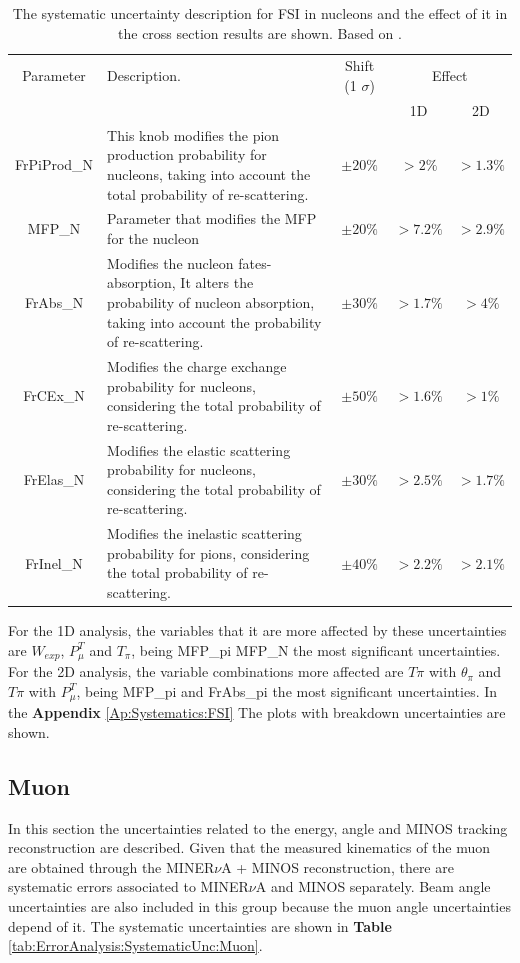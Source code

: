 \begin{table}[!htb]
    \centering
    \begin{tabular}{c|p{2in}|c|c|c}
        \hline 
        Parameter & Description.  & Shift (1 $\sigma$) & \multicolumn{2}{c}{Effect} \\
         & & & 1D & 2D \\
        \hline  
        FrPiProd\_N & This knob modifies the pion production probability for nucleons, taking into account the total probability of re-scattering. & $\pm20\%$ & $>2\%$ & $>1.3\%$\\ \hline
        MFP\_N & Parameter that modifies the MFP for the nucleon & $\pm20\%$ & $>7.2\%$ & $>2.9\%$ \\ \hline
        FrAbs\_N & Modifies the nucleon fates-absorption, It alters the probability of nucleon absorption, taking into account the probability of re-scattering. & $\pm30\%$ & $>1.7\%$ & $>4\%$ \\ \hline
        FrCEx\_N & Modifies the charge exchange probability for nucleons, considering the total probability of re-scattering. & $\pm50\%$ & $>1.6\%$ & $>1\%$\\ \hline
        FrElas\_N & Modifies the elastic scattering probability for nucleons, considering the total probability of re-scattering. & $\pm30\%$ & $>2.5\%$ & $>1.7\%$ \\ \hline
        FrInel\_N & Modifies the inelastic scattering probability for pions, considering the total probability of re-scattering. & $\pm40\%$ & $>2.2\%$ & $>2.1\%$\\ \hline
        
    \end{tabular}
    \caption{The systematic uncertainty description for FSI in nucleons and the effect of it in the cross section results are shown. Based on \cite{GENIEUnc}.}
    \label{tab:ErrorAnalysis:SystematicUnc:FSIN}
\end{table}

For the 1D analysis, the variables that it are more affected by these uncertainties are $W_{exp}$, $P^T_\mu$ and $T_\pi$, being MFP\_pi MFP\_N the most significant uncertainties. For the 2D analysis, the variable combinations more affected are $T\pi$ with $\theta_\pi$ and $T\pi$ with $P^T_\mu$, being MFP\_pi and FrAbs\_pi the most significant uncertainties. In the \textbf{Appendix} \ref{Ap:Systematics:FSI} The plots with breakdown uncertainties are shown.


\subsection{Muon}
\label{Cap:ErrorAnalysis:SystematicUnc:Muon}
In this section the uncertainties related to the energy, angle  and MINOS tracking reconstruction are described. Given that the measured kinematics of the muon are obtained through the MINER$\nu$A + MINOS reconstruction, there are systematic errors associated to MINER$\nu$A and MINOS separately. Beam angle uncertainties are also included in this group because the muon angle uncertainties depend of it. The systematic uncertainties are shown in \textbf{Table} \ref{tab:ErrorAnalysis:SystematicUnc:Muon}.  

